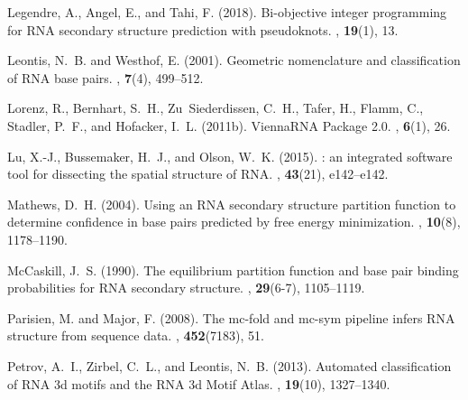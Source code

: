 \documentclass{bioinfo}
\begin{document}
\begin{thebibliography}{25}
   Legendre, A., Angel, E., and Tahi, F. (2018).
   \newblock Bi-objective integer programming for {RNA} secondary structure
     prediction with pseudoknots.
   , {\bf 19}(1), 13.
   
   Leontis, N.~B. and Westhof, E. (2001).
   \newblock Geometric nomenclature and classification of {RNA} base pairs.
   , {\bf 7}(4), 499--512.
      
   Lorenz, R., Bernhart, S.~H., Zu~Siederdissen, C.~H., Tafer, H., Flamm, C.,
     Stadler, P.~F., and Hofacker, I.~L. (2011b).
   \newblock ViennaRNA Package 2.0.
   , {\bf 6}(1), 26.
   
   Lu, X.-J., Bussemaker, H.~J., and Olson, W.~K. (2015).
   : an integrated software tool for dissecting the spatial
     structure of {RNA}.
   , {\bf 43}(21), e142--e142.
   
   Mathews, D.~H. (2004).
   \newblock Using an {RNA} secondary structure partition function to determine
     confidence in base pairs predicted by free energy minimization.
   , {\bf 10}(8), 1178--1190.
   
   McCaskill, J.~S. (1990).
   \newblock The equilibrium partition function and base pair binding
     probabilities for {RNA} secondary structure.
   , {\bf
     29}(6-7), 1105--1119.
   
   Parisien, M. and Major, F. (2008).
   \newblock The mc-fold and mc-sym pipeline infers {RNA} structure from sequence
     data.
   , {\bf 452}(7183), 51.
   
   Petrov, A.~I., Zirbel, C.~L., and Leontis, N.~B. (2013).
   \newblock Automated classification of {RNA} 3d motifs and the {RNA} 3d {Motif}
     {Atlas}.
   , {\bf 19}(10), 1327--1340.
   

\end{thebibliography}
\end{document}
